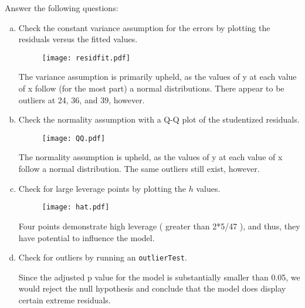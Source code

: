 \documentclass[12pt,letterpaper]{article}
\begin{document}
Answer the following questions:
\vspace{.5cm}
\begin{enumerate}[(a)]
	 \item Check the constant variance assumption for the errors by plotting the residuals versus the fitted values. 
	   
	
	\begin{figure}[h!]\centering
		\caption{\footnotesize }
		\label{fig:plot_a}
		\texttt{[image: residfit.pdf]}
		\end{figure}
		
		
	The variance assumption is primarily upheld, as the values of y at each value of x follow (for the most part) a normal distributions. There appear to be outliers at 24, 36, and 39, however.
	\vspace{.5cm}
	
	\item Check the normality assumption with a Q-Q plot of the studentized residuals. 
	   
	
	\begin{figure}[h!]\centering
		\caption{\footnotesize }
		\label{fig:plot_b}
		\texttt{[image: QQ.pdf]}
		\end{figure}
	
	The normality assumption is upheld, as the values of y at each value of x follow a normal distribution. The same outliers still exist, however. 
	\vspace{.5cm}
  
	\item Check for large leverage points by plotting the $h$ values. 
		 
	
	\begin{figure}[h!]\centering
		\caption{\footnotesize }
		\label{fig:plot_c}
		\texttt{[image: hat.pdf]}
		\end{figure}
	
	Four points demonstrate high leverage ( greater than  2*5/47 ), and thus, they have potential to influence the model.

		
	\item Check for outliers by running an \texttt{outlierTest}. 
	   
	
	Since the adjusted p value for the model is substantially smaller than 0.05, we would reject the null hypothesis and conclude that the model does display certain extreme residuals. 
	\vspace{.25cm}
	

\end{enumerate}
\end{document}
